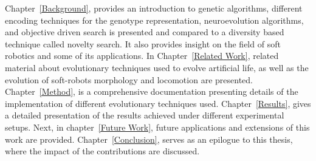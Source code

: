 Chapter~\ref{Background}, provides an introduction to genetic algorithms, different encoding techniques for the genotype representation, neuroevolution algorithms, and objective driven search is presented and compared to a diversity based technique called novelty search. It also provides insight on the field of soft robotics and some of its applications. In Chapter~\ref{Related Work}, related material about evolutionary techniques used to evolve artificial life, as well as the evolution of soft-robots morphology and locomotion are presented. Chapter~\ref{Method}, is a comprehensive documentation presenting details of the implementation of different evolutionary techniques used. Chapter~\ref{Results}, gives a detailed presentation of the results achieved under different experimental setups. Next, in chapter~\ref{Future Work}, future applications and extensions of this work are provided. Chapter~\ref{Conclusion}, serves as an epilogue to this thesis, where the impact of the contributions are discussed.






